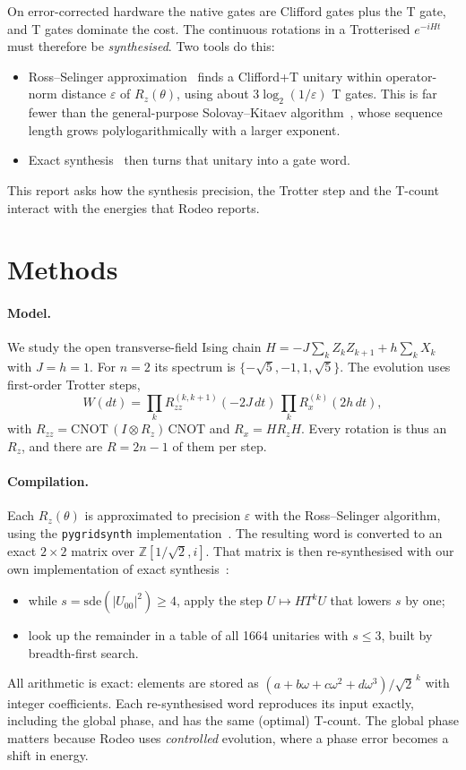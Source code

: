 \documentclass[10pt,a4paper]{article}
\begin{document}
On error-corrected hardware the native gates are Clifford gates plus the T gate, and T gates dominate the cost. The continuous rotations in a Trotterised $e^{-iHt}$ must therefore be \emph{synthesised}. Two tools do this:
\begin{itemize}
\item Ross--Selinger approximation~\cite{ross} finds a Clifford+T unitary within operator-norm distance $\varepsilon$ of $R_z(\theta)$, using about $3\log_2(1/\varepsilon)$ T gates. This is far fewer than the general-purpose Solovay--Kitaev algorithm~\cite{sk}, whose sequence length grows polylogarithmically with a larger exponent.
\item Exact synthesis~\cite{kmm} then turns that unitary into a gate word.
\end{itemize}
This report asks how the synthesis precision, the Trotter step and the T-count interact with the energies that Rodeo reports.

\section{Methods}
\paragraph{Model.} We study the open transverse-field Ising chain $H=-J\sum_k Z_kZ_{k+1}+h\sum_k X_k$ with $J=h=1$. For $n=2$ its spectrum is $\{-\sqrt5,-1,1,\sqrt5\}$. The evolution uses first-order Trotter steps,
\[
W(dt)=\prod_k R_{zz}^{(k,k+1)}(-2J\,dt)\,\prod_k R_x^{(k)}(2h\,dt),
\]
with $R_{zz}=\mathrm{CNOT}\,(I\otimes R_z)\,\mathrm{CNOT}$ and $R_x=H R_z H$. Every rotation is thus an $R_z$, and there are $R=2n-1$ of them per step.

\paragraph{Compilation.} Each $R_z(\theta)$ is approximated to precision $\varepsilon$ with the Ross--Selinger algorithm, using the \texttt{pygridsynth} implementation~\cite{pygridsynth}. The resulting word is converted to an exact $2\times2$ matrix over $\mathbb Z[1/\sqrt2,i]$. That matrix is then re-synthesised with our own implementation of exact synthesis~\cite{kmm}:
\begin{itemize}
\item while $s=\mathrm{sde}(|U_{00}|^2)\ge4$, apply the step $U\mapsto HT^kU$ that lowers $s$ by one;
\item look up the remainder in a table of all 1664 unitaries with $s\le3$, built by breadth-first search.
\end{itemize}
All arithmetic is exact: elements are stored as $(a+b\omega+c\omega^2+d\omega^3)/\sqrt2^{\,k}$ with integer coefficients. Each re-synthesised word reproduces its input exactly, including the global phase, and has the same (optimal) T-count. The global phase matters because Rodeo uses \emph{controlled} evolution, where a phase error becomes a shift in energy.
\end{document}
